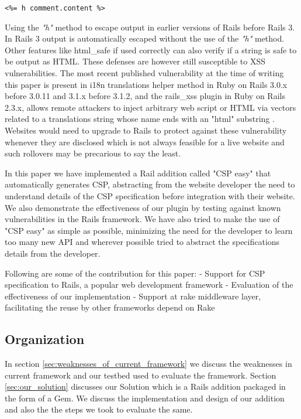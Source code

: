 \documentclass[10pt, conference, compsocconf]{IEEEtran}
\begin{document}
\begin{lstlisting}
<%= h comment.content %>
\end{lstlisting}

Using the \emph{"h"} method to escape output in earlier versions of Rails before Rails 3. In Rails 3 output is automatically escaped without the use of the \emph{"h"} method. 
Other features like html\_safe if used correctly can also verify if a string is safe to be output as HTML. These defenses are however still susceptible to XSS vulnerabilities. The most recent published vulnerability at the time of writing this paper is present in i18n translations helper method in Ruby on Rails 3.0.x before 3.0.11 and 3.1.x before 3.1.2, and the rails\_xss plugin in Ruby on Rails 2.3.x, allows remote attackers to inject arbitrary web script or HTML via vectors related to a translations string whose name ends with an "html" substring \cite{IEEEhowto:cve_rails}. Websites would need to upgrade to Rails to protect against these vulnerability whenever they are disclosed which is not always feasible for a live website and such rollovers may be precarious to say the least.

In this paper we have implemented a Rail addition called "CSP easy" that automatically generates CSP, abstracting from the website developer the need to understand details of the CSP specification before integration with their website. We also demonstrate the effectiveness of our plugin by testing against known vulnerabilities in the Rails framework. We have also tried to make the use of "CSP easy" as simple as possible, minimizing the need for the developer to learn too many new API and wherever possible tried to abstract the specifications details from the developer.

Following are some of the contribution for this paper:
- Support for CSP specification to Rails, a popular web development framework
- Evaluation of the effectiveness of our implementation
- Support at rake middleware layer, facilitating the reuse by other frameworks depend on Rake 

\subsection{Organization}
In section \ref{sec:weaknesses_of_current_framework} we discuss the weaknesses in current framework and our testbed used to evaluate the framework. Section \ref{sec:our_solution} discusses our Solution which is a Rails addition packaged in the form of a Gem. We discuss the implementation and design of our addition and also the the steps we took to evaluate the same.
\end{document}
